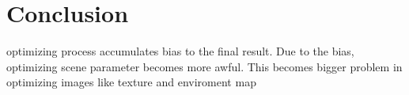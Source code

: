 \section*{Conclusion}\label{ch:ch5label}


optimizing process accumulates bias to the final result.
Due to the bias, optimizing scene parameter becomes more awful. This becomes bigger problem in optimizing images like texture and enviroment map